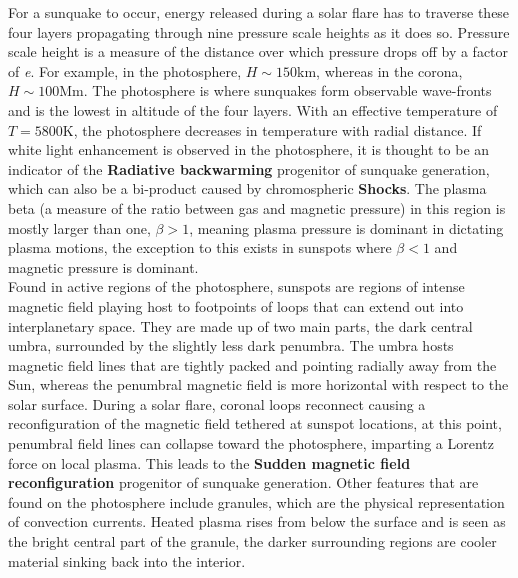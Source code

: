 For a sunquake to occur, energy released during a solar flare has to traverse these four layers propagating through nine pressure scale heights as it does so. Pressure scale height is a measure of the distance over which pressure drops off by a factor of \emph{e}. For example, in the photosphere, $H\sim150$km, whereas in the corona, $H\sim100$Mm. The photosphere is where sunquakes form observable wave-fronts and is the lowest in altitude of the four layers. With an effective temperature of $T=5800$K, the photosphere decreases in temperature with radial distance. If white light enhancement is observed in the photosphere, it is thought to be an indicator of the \textbf{Radiative backwarming} progenitor of sunquake generation, which can also be a bi-product caused by chromospheric \textbf{Shocks}. The plasma beta (a measure of the ratio between gas and magnetic pressure) in this region is mostly larger than one, $\beta >1$, meaning plasma pressure is dominant in dictating plasma motions, the exception to this exists in sunspots where $\beta<1$ and magnetic pressure is dominant. \\ 

Found in active regions of the photosphere, sunspots are regions of intense magnetic field playing host to footpoints of loops that can extend out into interplanetary space. They are made up of two main parts, the dark central umbra, surrounded by the slightly less dark penumbra. The umbra hosts magnetic field lines that are tightly packed and pointing radially away from the Sun, whereas the penumbral magnetic field is more horizontal with respect to the solar surface. During a solar flare, coronal loops reconnect causing a reconfiguration of the magnetic field tethered at sunspot locations, at this point, penumbral field lines can collapse toward the photosphere, imparting a Lorentz force on local plasma. This leads to the \textbf{Sudden magnetic field reconfiguration} progenitor of sunquake generation. Other features that are found on the photosphere include granules, which are the physical representation of convection currents. Heated plasma rises from below the surface and is seen as the bright central part of the granule, the darker surrounding regions are cooler material sinking back into the interior. \\

